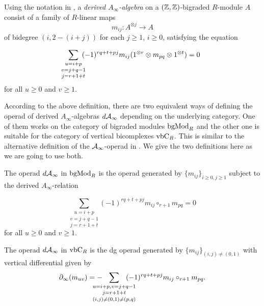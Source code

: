 \documentclass[Thesis.tex]{subfiles}
\begin{document}
  \begin{defin}
  Using the notation in \cite{RW}, a \emph{derived $A_\infty$-algebra} on a $(\mathbb{Z},\mathbb{Z})$-bigraded $R$-module $A$ consist of a family of $R$-linear maps 
\[m_{ij}:A^{\otimes j}\to A\]
of bidegree $(i,2-(i+j))$ for each $j\geq 1$, $i\geq 0$, satisfying the equation

\begin{equation}\label{dainftyequation}
\underset{\mathclap{j=r+1+t}}{\underset{\mathclap{v=j+q-1}}{\sum_{u=i+p}}}(-1)^{rq+t+pj}m_{ij}(1^{\otimes r}\otimes m_{pq}\otimes 1^{\otimes t})=0
\end{equation}
for all $u\geq 0$ and $v\geq 1$. 
\end{defin}

According to the above definition, there are two equivalent ways of defining the operad of derived $A_\infty$-algebras $d\mathcal{A}_\infty$ depending on the underlying category. One of them works on the category of bigraded modules $\mathrm{bgMod}_R$ and the other one is suitable for the category of vertical bicomplexes $\mathrm{vbC}_R$. This is similar to the alternative definition of the $\mathcal{A}_\infty$-operad in . We give the two definitions here as we are going to use both.

\begin{defin}\label{dainftyoperad}
The operad $d\mathcal{A}_\infty$ in $\mathrm{bgMod}_R$ is the operad generated by $\{m_{ij}\}_{i\geq 0,j\geq 1}$ subject to the derived $A_\infty$-relation

\[\underset{j=r+1+t}{\underset{v=j+q-1}{\sum_{u=i+p}}}(-1)^{rq+t+pj}m_{ij}\circ_{r+1} m_{pq}=0\]
for all $u\geq 0$ and $v\geq 1$. 

The operad $d\mathcal{A}_\infty$ in $\mathrm{vbC}_R$ is the dg operad generated by $\{m_{ij}\}_{(i,j)\neq (0,1)}$ with vertical differential given by
\[\partial_\infty(m_{uv})=-\underset{\mathclap{(i,j)\neq (0,1)\neq (p,q)}}{\underset{j=r+1+t}{\sum_{\mathclap{u=i+p, v=j+q-1}}}}(-1)^{rq+t+pj}m_{ij}\circ_{r+1} m_{pq}.\] %
\end{defin}
\end{document}
